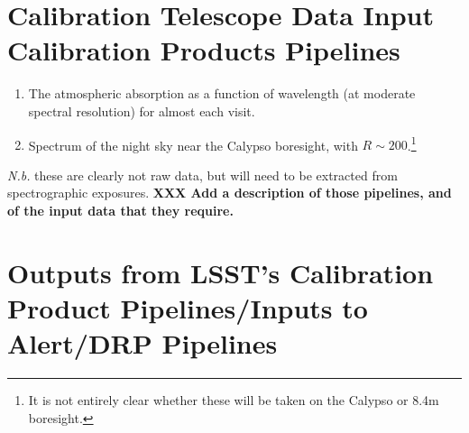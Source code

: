 \documentclass[12pt]{article}
\newcommand{\Nb}{\textit{N.b.}\xspace}
\newcommand{\XXX}[1]{\textbf{XXX #1}\xspace}
\begin{document}

\section{Calibration Telescope Data Input Calibration Products Pipelines}
\label{sec:calibrationTelescopeDatasets}

\begin{enumerate}[label=$\heartsuit$\arabic*,itemsep=5pt]
   \item\label{calypso:atmosphericAbsorption} The atmospheric absorption as a function of wavelength (at
     moderate spectral resolution) for almost each visit.
   \item\label{calypso:nightSkySpectrum} Spectrum of the night sky near the Calypso boresight, with $R
     \sim 200$.\footnote{It is not entirely clear whether these will be taken on the Calypso or 8.4m
       boresight.}
\end{enumerate}

\Nb these are clearly not raw data, but will need to be extracted from spectrographic exposures.
\XXX{Add a description of those pipelines, and of the input data that they require.}


\section{Outputs from LSST's Calibration Product Pipelines/Inputs to Alert/DRP Pipelines}
\label{sec:calibrationOutputDatasets}
\end{document}
